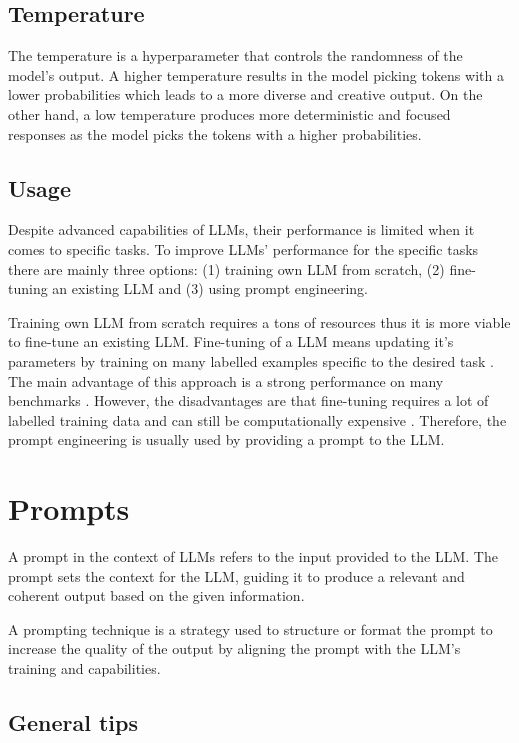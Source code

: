 \subsection{Temperature}
\label{temperature}

The temperature is a hyperparameter that controls the randomness of the model's output. A higher temperature results in the model picking tokens with a lower probabilities which leads to a more diverse and creative output. On the other hand, a low temperature produces more deterministic and focused responses as the model picks the tokens with a higher probabilities.


\subsection{Usage}

Despite advanced capabilities of LLMs, their performance is limited when it comes to specific tasks. To improve LLMs' performance for the specific tasks there are mainly three options: (1) training own LLM from scratch, (2) fine-tuning an existing LLM and (3) using prompt engineering.

Training own LLM from scratch requires a tons of resources \cite{Zhao2023} thus it is more viable to fine-tune an existing LLM. Fine-tuning of a LLM means updating it's parameters by training on many labelled examples specific to the desired task \cite{Brown2020}. The main advantage of this approach is a strong performance on many benchmarks \cite{Brown2020}. However, the disadvantages are that fine-tuning requires a lot of labelled training data and can still be computationally expensive \cite{Brown2020}. Therefore, the prompt engineering is usually used by providing a prompt to the LLM.


\section{Prompts}

A prompt in the context of LLMs refers to the input provided to the LLM. The prompt sets the context for the LLM, guiding it to produce a relevant and coherent output based on the given information.

A prompting technique is a strategy used to structure or format the prompt to increase the quality of the output by aligning the prompt with the LLM's training and capabilities.


\subsection{General tips}
\label{prompt_general_tips}


